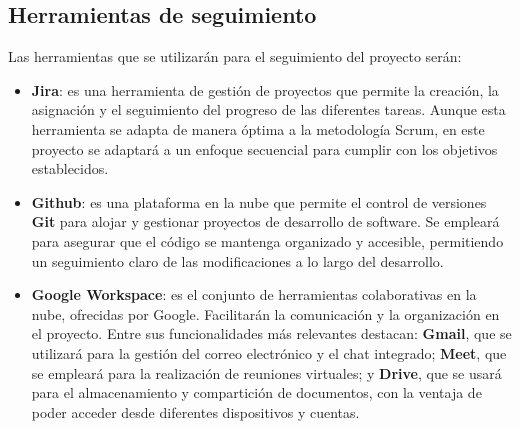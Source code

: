 \subsection{Herramientas de seguimiento}

Las herramientas que se utilizarán para el seguimiento del proyecto serán:
\begin{itemize}
    \item \textbf{Jira}\cite{ConfluenceEspacioTrabajo}: es una herramienta de gestión de proyectos que permite la creación, la asignación y el seguimiento 
    del progreso de las diferentes tareas. Aunque esta herramienta se adapta de manera óptima a la metodología Scrum, en 
    este proyecto se adaptará a un enfoque secuencial para cumplir con los objetivos establecidos.
    \item \textbf{Github}\cite{BuildSoftwareBetter}: es una plataforma en la nube que permite el control de versiones \textbf{Git} para alojar y gestionar 
    proyectos de desarrollo de software. Se empleará para asegurar que el código se mantenga organizado y accesible, permitiendo 
    un seguimiento claro de las modificaciones a lo largo del desarrollo.
    \item \textbf{Google Workspace}\cite{workspaceBusinessAppsHerramientas}: es el conjunto de herramientas colaborativas en la nube, ofrecidas por Google. Facilitarán 
    la comunicación y la organización en el proyecto. Entre sus funcionalidades más relevantes destacan: \textbf{Gmail}, que se 
    utilizará para la gestión del correo electrónico y el chat integrado; \textbf{Meet}, que se empleará para la realización de 
    reuniones virtuales; y \textbf{Drive}, que se usará para el almacenamiento y compartición de documentos, con la ventaja de 
    poder acceder desde diferentes dispositivos y cuentas.
\end{itemize}